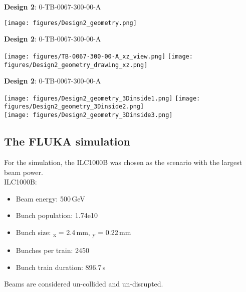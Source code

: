\documentclass[xcolor={dvipsnames}]{beamer}
\begin{document}
\begin{frame}{\textbf{Design 2}: 0-TB-0067-300-00-A}
\begin{center}
  \texttt{[image: figures/Design2\_geometry.png]}
\end{center}
\end{frame}
\begin{frame}{\textbf{Design 2}: 0-TB-0067-300-00-A}
\begin{center}
  \texttt{[image: figures/TB-0067-300-00-A\_xz\_view.png]}
  \hfill
  \texttt{[image: figures/Design2\_geometry\_drawing\_xz.png]}
\end{center}
\end{frame}
\begin{frame}{\textbf{Design 2}: 0-TB-0067-300-00-A}
\begin{center}
  \texttt{[image: figures/Design2\_geometry\_3Dinside1.png]}
    \texttt{[image: figures/Design2\_geometry\_3Dinside2.png]}\\
      \texttt{[image: figures/Design2\_geometry\_3Dinside3.png]}
\end{center}
\end{frame}



\subsection{The FLUKA simulation}
\begin{frame}
For the simulation, the ILC1000B was chosen as the scenario with the largest beam power.\\
\vspace*{0.5cm}
 ILC1000B:
 \begin{itemize}
  \item Beam energy: 500\,GeV
  \item Bunch population: 1.74e10
  \item Bunch size: \textsigma\textsubscript{x} = 2.4\,mm, \textsigma\textsubscript{y} = 0.22\,mm
  \item Bunches per train: 2450
  \item Bunch train duration: 896.7\,\textmu s
 \end{itemize}
\vspace*{0.2cm}
Beams are considered un-collided and un-disrupted.
\end{frame}
\end{document}
